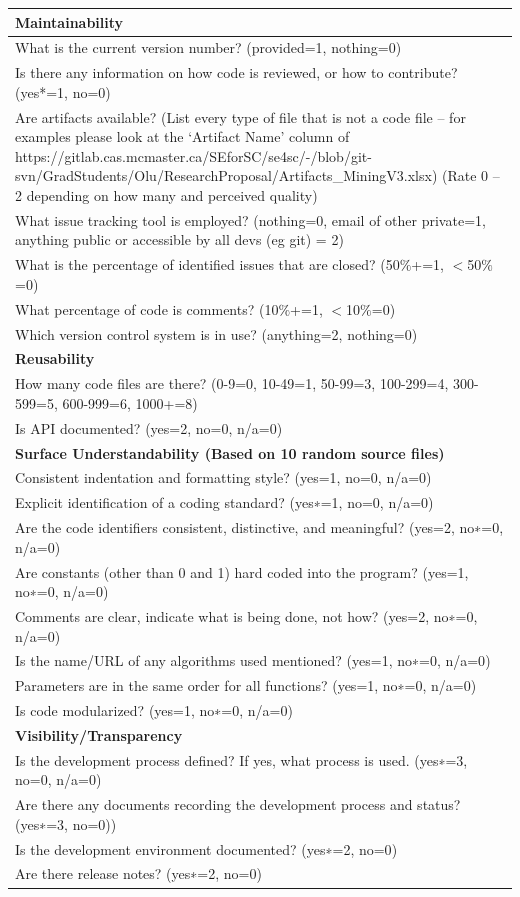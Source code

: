 \documentclass[12pt, notitlepage]{article}
\begin{document}
\begin{singlespace}
\def\arraystretch{1.4}
\begin{tabular}{p{16cm}}
	\hline
	\textbf{Maintainability}\\
	\hline
	What is the current version number? (provided=1, nothing=0)\\
	Is there any information on how code is reviewed, or how to contribute? ({yes*=1, no=0})\\
	Are artifacts available? (List every type of file that is not a code file – for examples please look at the ‘Artifact Name’ column of https://gitlab.cas.mcmaster.ca/SEforSC/se4sc/-/blob/git-svn/GradStudents/Olu/ResearchProposal/Artifacts\_MiningV3.xlsx) (Rate 0 – 2 depending on how many and perceived quality)\\
	What issue tracking tool is employed? (nothing=0, email of other private=1, anything public or accessible by all devs (eg git) = 2)\\
	What is the percentage of identified issues that are closed? (50$\%$+=1, $<$50$\%$=0)\\
	What percentage of code is comments? (10$\%$+=1, $<$10$\%$=0)\\
	Which version control system is in use? (anything=2, nothing=0)\\
	\hline		
	\textbf{Reusability}\\
	\hline
	How many code files are there? (0-9=0, 10-49=1, 50-99=3, 100-299=4, 300-599=5, 600-999=6, 1000+=8)\\
	Is API documented? ({yes=2, no=0, n/a=0})\\
	\hline	
	\textbf{Surface Understandability (Based on 10 random source files)}\\
	\hline
	Consistent indentation and formatting style? ({yes=1, no=0, n/a=0})\\
	Explicit identification of a coding standard? ({yes∗=1, no=0, n/a=0})\\
	Are the code identifiers consistent, distinctive, and meaningful? ({yes=2, no∗=0, n/a=0})\\
	Are constants (other than 0 and 1) hard coded into the program? ({yes=1, no∗=0, n/a=0})\\
	Comments are clear, indicate what is being done, not how? ({yes=2, no∗=0, n/a=0})\\
	Is the name/URL of any algorithms used mentioned? ({yes=1, no∗=0, n/a=0})\\
	Parameters are in the same order for all functions? ({yes=1, no∗=0, n/a=0})\\
	Is code modularized? ({yes=1, no∗=0, n/a=0})\\
	\hline		
	\textbf{Visibility/Transparency}\\
	\hline
	Is the development process defined? If yes, what process is used. ({yes∗=3, no=0, n/a=0})\\
	Are there any documents recording the development process and status?  ({yes∗=3, no=0}))\\
	Is the development environment documented? ({yes∗=2, no=0})\\
	Are there release notes? ({yes∗=2, no=0})\\
	\hline
\end{tabular}
\newpage


\end{singlespace}
\end{document}
